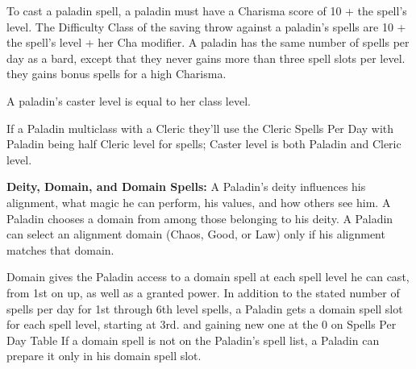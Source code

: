 To cast a paladin spell, a paladin must have a Charisma score of 10 + the spell's level. The Difficulty Class of the saving throw against a paladin's spells are 10 + the spell's level + her Cha modifier. A paladin has the same number of spells per day as a bard, except that they never gains more than three spell slots per level. they gains bonus spells for a high Charisma.

A paladin's caster level is equal to her class level.

If a Paladin multiclass with a Cleric they'll use the Cleric Spells Per Day with Paladin being half Cleric level for spells; Caster level is both Paladin and Cleric level. 

\textbf{Deity, Domain, and Domain Spells:} A Paladin's deity influences his alignment, what magic he can perform, his values, and how others see him. A Paladin chooses a domain from among those belonging to his deity. A Paladin can select an alignment domain (Chaos, Good, or Law) only if his alignment matches that domain.

Domain gives the Paladin access to a domain spell at each spell level he can cast, from 1st on up, as well as a granted power. In addition to the stated number of spells per day for 1st through 6th level spells, a Paladin gets a domain spell slot for each spell level, starting at 3rd. and gaining  new one at the 0 on Spells Per Day Table If a domain spell is not on the Paladin's spell list, a Paladin can prepare it only in his domain spell slot.

